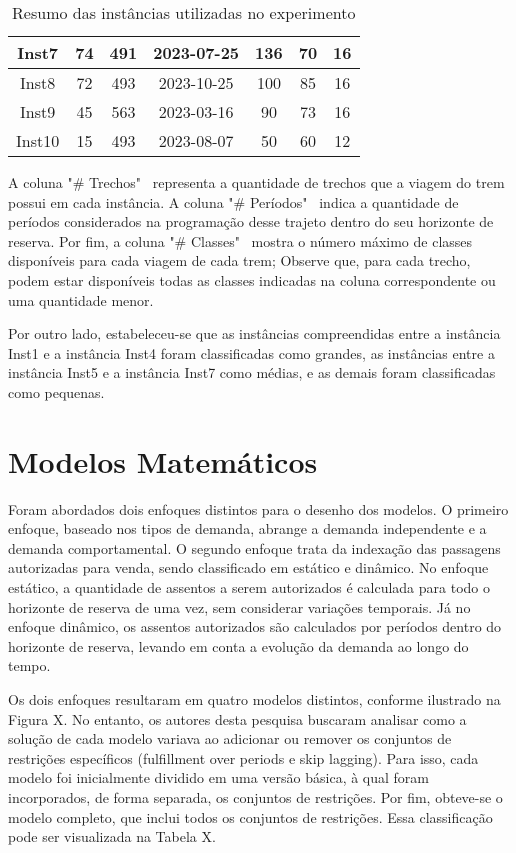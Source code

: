 \begin{table}[H]
\begin{tabular}{ccccccc}
		Inst7                                                               & 74 & 491 & 2023-07-25 & 136 & 70  & 16 \\\midrule
		Inst8                                                               & 72 & 493 & 2023-10-25 & 100 & 85  & 16 \\
		Inst9                                                               & 45 & 563 & 2023-03-16 & 90  & 73  & 16 \\
		Inst10                                                              & 15 & 493 & 2023-08-07 & 50  & 60  & 12 \\
		\bottomrule
	\end{tabular}
	\caption{Resumo das instâncias utilizadas no experimento}
	\label{tab: instancias}
\end{table}

A coluna "\# Trechos" \, representa a quantidade de trechos que a viagem do trem possui em cada instância. A coluna "\# Períodos" \, indica a quantidade de períodos considerados na programação desse trajeto dentro do seu horizonte de reserva. Por fim, a coluna "\# Classes" \, mostra o número máximo de classes disponíveis para cada viagem de cada trem; Observe que, para cada trecho, podem estar disponíveis todas as classes indicadas na coluna correspondente ou uma quantidade menor.

Por outro lado, estabeleceu-se que as instâncias compreendidas entre a instância Inst1 e a instância Inst4 foram classificadas como grandes, as instâncias entre a instância Inst5 e a instância Inst7 como médias, e as demais foram classificadas como pequenas.

\section{Modelos Matemáticos}
Foram abordados dois enfoques distintos para o desenho dos modelos. O primeiro enfoque, baseado nos tipos de demanda, abrange a demanda independente e a demanda comportamental. O segundo enfoque trata da indexação das passagens autorizadas para venda, sendo classificado em estático e dinâmico. No enfoque estático, a quantidade de assentos a serem autorizados é calculada para todo o horizonte de reserva de uma vez, sem considerar variações temporais. Já no enfoque dinâmico, os assentos autorizados são calculados por períodos dentro do horizonte de reserva, levando em conta a evolução da demanda ao longo do tempo.

Os dois enfoques resultaram em quatro modelos distintos, conforme ilustrado na Figura X. No entanto, os autores desta pesquisa buscaram analisar como a solução de cada modelo variava ao adicionar ou remover os conjuntos de restrições específicos (fulfillment over periods e skip lagging). Para isso, cada modelo foi inicialmente dividido em uma versão básica, à qual foram incorporados, de forma separada, os conjuntos de restrições. Por fim, obteve-se o modelo completo, que inclui todos os conjuntos de restrições. Essa classificação pode ser visualizada na Tabela X.


